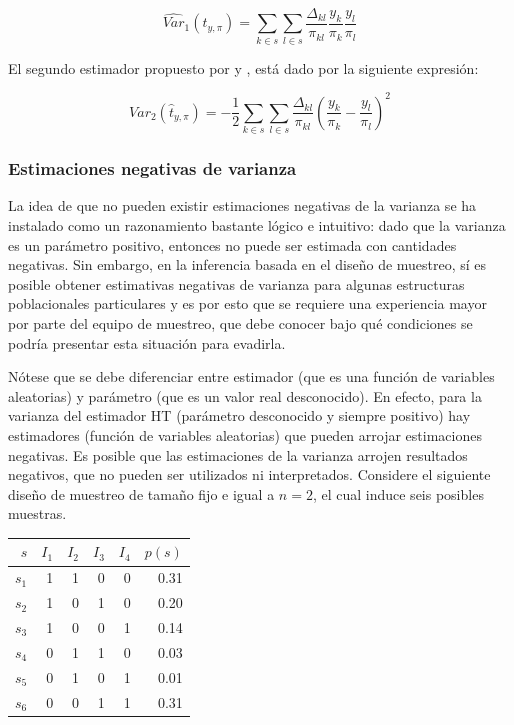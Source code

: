 \documentclass[
  12pt,
  spanish,
]{book}
\begin{document}
\[
\widehat{Var}_1(\hat{t}_{y, \pi})=
\sum_{k\in s}\sum_{l\in s} \frac{\Delta_{kl}}{\pi_{kl}}\frac{y_k}{\pi_k}\frac{y_l}{\pi_l}
\]

El segundo estimador propuesto por \citet{Sen} y \citet{YG}, está dado por la siguiente expresión:

\[
\widehat{Var}_2(\hat{t}_{y, \pi})=-\frac{1}{2}
\sum_{k\in s}\sum_{l\in s} \frac{\Delta_{kl}}{\pi_{kl}}\left(\frac{y_k}{\pi_k}-\frac{y_l}{\pi_l}\right)^2
\]

\hypertarget{estimaciones-negativas-de-varianza}{%
\subsubsection*{Estimaciones negativas de varianza}\label{estimaciones-negativas-de-varianza}}

La idea de que no pueden existir estimaciones negativas de la varianza se ha instalado como un razonamiento bastante lógico e intuitivo: dado que la varianza es un parámetro positivo, entonces no puede ser estimada con cantidades negativas. Sin embargo, en la inferencia basada en el diseño de muestreo, sí es posible obtener estimativas negativas de varianza para algunas estructuras poblacionales particulares y es por esto que se requiere una experiencia mayor por parte del equipo de muestreo, que debe conocer bajo qué condiciones se podría presentar esta situación para evadirla.

Nótese que se debe diferenciar entre estimador (que es una función de variables aleatorias) y parámetro (que es un valor real desconocido). En efecto, para la varianza del estimador HT (parámetro desconocido y siempre positivo) hay estimadores (función de variables aleatorias) que pueden arrojar estimaciones negativas. Es posible que las estimaciones de la varianza arrojen resultados negativos, que no pueden ser utilizados ni interpretados. Considere el siguiente diseño de muestreo de tamaño fijo e igual a \(n=2\), el cual induce seis posibles muestras.

\begin{longtable}[]{@{}rrrrrr@{}}
\toprule
\(s\) & \(I_1\) & \(I_2\) & \(I_3\) & \(I_4\) & \(p(s)\) \\
\midrule
\endhead
\(s_1\) & 1 & 1 & 0 & 0 & 0.31 \\
\(s_2\) & 1 & 0 & 1 & 0 & 0.20 \\
\(s_3\) & 1 & 0 & 0 & 1 & 0.14 \\
\(s_4\) & 0 & 1 & 1 & 0 & 0.03 \\
\(s_5\) & 0 & 1 & 0 & 1 & 0.01 \\
\(s_6\) & 0 & 0 & 1 & 1 & 0.31 \\
\bottomrule
\end{longtable}
\end{document}
